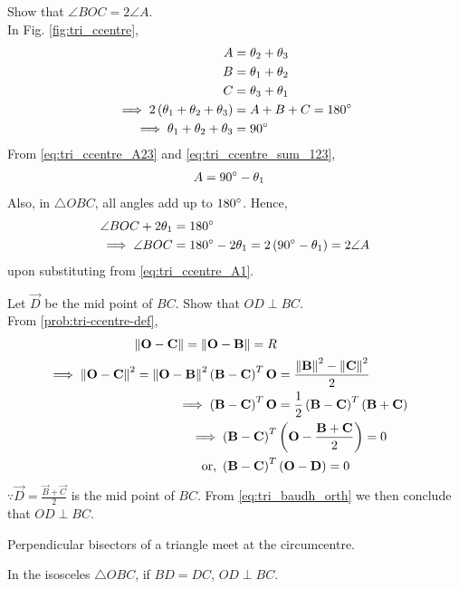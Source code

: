   \iffalse
%
\item  Show that $\angle BOC = 2\angle A$.
\label{prob:tri_ccentre_subtend}
%
\\
\solution In Fig. \ref{fig:tri_ccentre}, 
%
\begin{align}
%
\label{eq:tri_ccentre_A23}
A &= \theta_2+\theta_3
\\
B &= \theta_1+\theta_2
\\
C &= \theta_3+\theta_1
\\
\implies 2\brak{\theta_1+\theta_2+\theta_3} &= A+B+C =180\degree
\\
\implies \theta_1+\theta_2+\theta_3 &= 90\degree
\label{eq:tri_ccentre_sum_123}
\end{align}
%
From \eqref{eq:tri_ccentre_A23} and \eqref{eq:tri_ccentre_sum_123},
%
\begin{align}
%
\label{eq:tri_ccentre_A1}
A &= 90\degree - \theta_1
\end{align}
%
Also, in $\triangle OBC$, all angles add up to $180\degree$.  Hence, 
%
\begin{align}
\angle BOC + 2\theta_1 &= 180\degree
\\
\implies \angle BOC &= 180\degree - 2\theta_1 = 2 \left(90\degree - \theta_1\right)
= 2\angle A
\end{align}
%
upon substituting from \eqref{eq:tri_ccentre_A1}.
%
\item Let $\vec{D}$ be the mid point of $BC$.  Show that $OD \perp BC$.
\label{prob:tri_perp_bisect}
%
\\
\solution From 
	\eqref{prob:tri-ccentre-def},
%
\begin{align}
	\left\lVert\mathbf{O}-\mathbf{C}\right\rVert = 
	\left\lVert\mathbf{O}-\mathbf{B}\right\rVert  = R
	\\
	\implies 
	\left\lVert\mathbf{O}-\mathbf{C}\right\rVert^2 = 
	\left\lVert\mathbf{O}-\mathbf{B}\right\rVert^2
\left(\mathbf{B}-\mathbf{C}\right)^T\mathbf{O} &=   \frac{\left\lVert\mathbf{B}\right\rVert^2- \left\lVert\mathbf{C}\right\rVert^2}{2}
\\
\implies \left(\mathbf{B}-\mathbf{C}\right)^T\mathbf{O} &=   \frac{1}{2}\left(\mathbf{B}- \mathbf{C}\right)^T\left(\mathbf{B}+ \mathbf{C}\right)
\\
\implies \left(\mathbf{B}-\mathbf{C}\right)^T&\left(\mathbf{O} - \frac{\mathbf{B}+\mathbf{C}}{2}\right) = 0
\\
\text{or, } \left(\mathbf{B}-\mathbf{C}\right)^T&\left(\mathbf{O} - \mathbf{D}\right) = 0
\end{align}
%
$\because \vec{D} = \frac{\vec{B}+\vec{C}}{2}$ is the mid point of $BC$.  From \eqref{eq:tri_baudh_orth} we then conclude that $OD \perp BC$.
%
\item Perpendicular bisectors of a triangle meet at the circumcentre.
%
\item In the isosceles $\triangle OBC$, if $BD = DC$, $OD \perp BC$.
\label{them:isos_pb}

